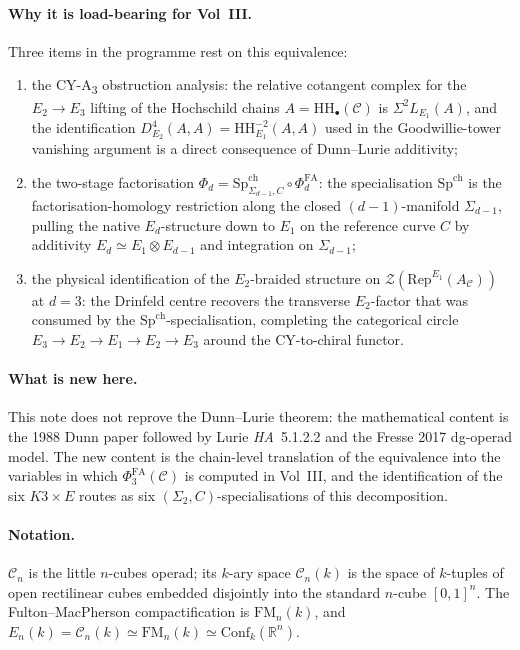 \documentclass[11pt]{article}
\newcommand{\Eone}{E_{1}}
\newcommand{\Etwo}{E_{2}}
\newcommand{\Ethree}{E_{3}}
\newcommand{\Cube}{\mathscr{C}}
\newcommand{\Conf}{\mathrm{Conf}}
\newcommand{\R}{\mathbb{R}}
\newcommand{\HH}{\mathrm{HH}}
\newcommand{\PhiFA}{\Phi^{\mathrm{FA}}}
\newcommand{\SpCh}{\mathrm{Sp}^{\mathrm{ch}}}
\newcommand{\cC}{\mathcal{C}}
\newcommand{\cZ}{\mathcal{Z}}
\newcommand{\Rep}{\mathrm{Rep}}
\begin{document}
\paragraph{Why it is load-bearing for Vol~III.}
Three items in the programme rest on this equivalence:
\begin{enumerate}[label=(\roman*), leftmargin=*]
  \item the CY-A\textsubscript{3} obstruction analysis: the relative cotangent complex
    for the $\Etwo \to \Ethree$ lifting of the Hochschild chains
    $A = \HH_{\bullet}(\cC)$ is $\Sigma^{2} L_{\Eone}(A)$, and
    the identification $D^{4}_{\Etwo}(A, A) = \HH^{-2}_{\Eone}(A, A)$
    used in the Goodwillie-tower vanishing argument is a direct
    consequence of Dunn--Lurie additivity;
  \item the two-stage factorisation $\Phi_{d} = \SpCh_{\Sigma_{d-1}, C}
    \circ \PhiFA_{d}$: the specialisation $\SpCh$ is the
    factorisation-homology restriction along the closed $(d - 1)$-manifold
    $\Sigma_{d-1}$, pulling the native $E_{d}$-structure down to
    $E_{1}$ on the reference curve $C$ by additivity
    $E_{d} \simeq E_{1} \otimes E_{d-1}$ and integration on
    $\Sigma_{d-1}$;
  \item the physical identification of the $\Etwo$-braided structure on
    $\cZ(\Rep^{\Eone}(A_{\cC}))$ at $d = 3$: the Drinfeld centre
    recovers the transverse $\Etwo$-factor that was consumed by the
    $\SpCh$-specialisation, completing the categorical circle
    $E_{3} \to E_{2} \to E_{1} \to E_{2} \to E_{3}$ around the
    CY-to-chiral functor.
\end{enumerate}

\paragraph{What is new here.}
This note does not reprove the Dunn--Lurie theorem: the mathematical
content is the 1988 Dunn paper followed by Lurie \emph{HA}~5.1.2.2 and
the Fresse 2017 dg-operad model. The new content is the
chain-level translation of the equivalence into the variables in which
$\PhiFA_{3}(\cC)$ is computed in Vol~III, and the identification of the
six $K3 \times E$ routes as six $(\Sigma_{2}, C)$-specialisations of
this decomposition.

\paragraph{Notation.}
$\Cube_{n}$ is the little $n$-cubes operad; its $k$-ary space
$\Cube_{n}(k)$ is the space of $k$-tuples of open rectilinear cubes
embedded disjointly into the standard $n$-cube $[0, 1]^{n}$. The
Fulton--MacPherson compactification is $\mathrm{FM}_{n}(k)$, and
$E_{n}(k) = \Cube_{n}(k) \simeq \mathrm{FM}_{n}(k) \simeq
\Conf_{k}(\R^{n})$.
\end{document}
